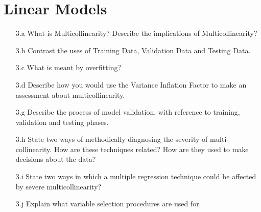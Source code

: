 \documentclass[a4paper,12pt]{article}
\begin{document}
\section*{Linear Models}
\begin{itemize}

\item[3.a] What is Multicollinearity? Describe the implications of Multicollinearity?
\item[3.b] Contrast the uses of Training Data, Validation Data and Testing Data.
\item[3.c] What is meant by overfitting?
\item[3.d] Describe how you would use the Variance Inflation Factor to make an assessment about multicollinearity.

\item[3.g] Describe the process of model validation, with reference to training, validation and testing phases.
\item[3.h] State two ways of methodically diagnosing the severity of multi-collinearity. How are these techniques related? How are they used to make decisions about the data?
\item[3.i] State two ways in which a multiple regression technique could be affected by severe multicollinearity?
\item[3.j] Explain what variable selection procedures are used for.

\end{itemize}
\end{document}
